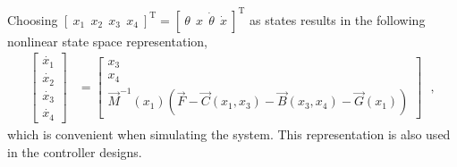 Choosing $ [\ x_1\ \ x_2\ \ x_3\ \ x_4\ ]^\mathrm{T} = [\ \theta\ \ x\ \ \dot{\theta}\ \ \dot{x}\ ]^\mathrm{T} $ as states results in the following nonlinear state space representation,
%
\begin{align}
  \begin{bmatrix}
    \dot{x_1} \\
    \dot{x_2} \\
    \dot{x_3} \\
    \dot{x_4}
  \end{bmatrix}
  &=
  \begin{bmatrix}
    x_3 \\
    x_4 \\
    \vec{M}^{-1}(x_1) ( \vec{F} - \vec{C}(x_1,x_3) - \vec{B}(x_3,x_4) - \vec{G}(x_1) )
  \end{bmatrix}
  \label{eq:nonlinearStateSpace} \ \ \ ,
\end{align}
%
which is convenient when simulating the system. This representation is also used in the controller designs.